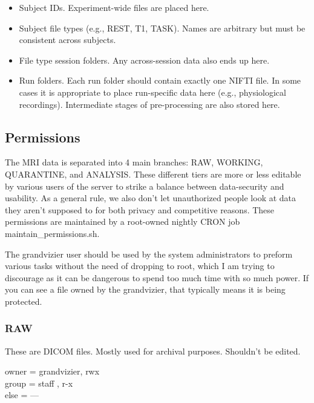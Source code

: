 \documentclass[final,titlepage,letterpaper,oneside,12pt]{article}
\renewcommand{\texttt}[2][BrickRed]{\textcolor{#1}{\ttfamily #2}}%
\begin{document}
\begin{itemize} \itemsep-2pt
    \item{Subject IDs. Experiment-wide files are placed here.}
    \item{Subject file types (e.g., REST, T1, TASK). Names are arbitrary but must be consistent across subjects.}
    \item{File type session folders. Any across-session data also ends up here.}
    \item{Run folders. Each run folder should contain exactly one NIFTI file. In some cases it is appropriate to place run-specific data here (e.g., physiological recordings). Intermediate stages of pre-processing are also stored here.}
\end{itemize}

\subsection{Permissions}

The MRI data is separated into 4 main branches: RAW, WORKING, QUARANTINE, and ANALYSIS. These different tiers are more or less editable by various users of the server to strike a balance between data-security and usability. As a general rule, we also don't let unauthorized people look at data they aren't supposed to for both privacy and competitive reasons. These permissions are maintained by a \texttt{root}-owned nightly \texttt{CRON} job {\color{red}\texttt{maintain\_permissions.sh}}.

The \texttt{grandvizier} user should be used by the system administrators to preform various tasks without the need of dropping to \texttt{root}, which I am trying to discourage as it can be dangerous to spend too much time with so much power. If you can see a file owned by the \texttt{grandvizier}, that typically means it is being protected.  

\subsubsection{RAW}

These are DICOM files. Mostly used for archival purposes. Shouldn't be edited.

\begin{flushleft}
\texttt{owner = grandvizier, rwx \\
        group = staff      , r-x \\
        else  = ---} \\
\end{flushleft}
\end{document}
